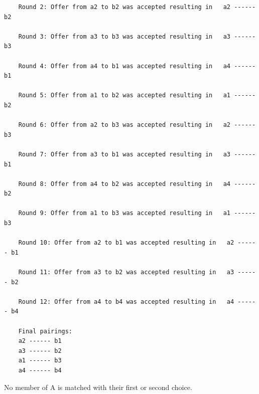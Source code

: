 \documentclass[12pt]{article}
\begin{document}
\begin{itemize}
\begin{verbatim}
    Round 2: Offer from a2 to b2 was accepted resulting in   a2 ------ b2
    
    Round 3: Offer from a3 to b3 was accepted resulting in   a3 ------ b3
    
    Round 4: Offer from a4 to b1 was accepted resulting in   a4 ------ b1
    
    Round 5: Offer from a1 to b2 was accepted resulting in   a1 ------ b2
    
    Round 6: Offer from a2 to b3 was accepted resulting in   a2 ------ b3
    
    Round 7: Offer from a3 to b1 was accepted resulting in   a3 ------ b1
    
    Round 8: Offer from a4 to b2 was accepted resulting in   a4 ------ b2
    
    Round 9: Offer from a1 to b3 was accepted resulting in   a1 ------ b3
    
    Round 10: Offer from a2 to b1 was accepted resulting in   a2 ------ b1
    
    Round 11: Offer from a3 to b2 was accepted resulting in   a3 ------ b2
    
    Round 12: Offer from a4 to b4 was accepted resulting in   a4 ------ b4
    
    Final pairings: 
    a2 ------ b1
    a3 ------ b2
    a1 ------ b3
    a4 ------ b4
    \end{verbatim}

    No member of A is matched with their first or second choice.
\end{itemize}
\end{document}
